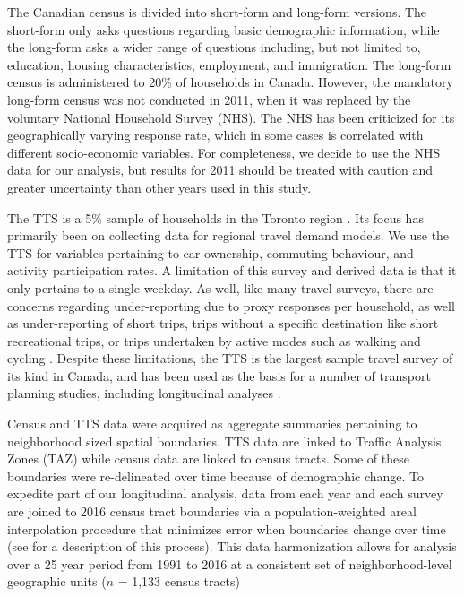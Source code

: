 The Canadian census is divided into short-form and long-form versions. The short-form only asks questions regarding basic demographic information, while the long-form asks a wider range of questions including, but not limited to, education, housing characteristics, employment, and immigration. The long-form census is administered to 20\% of households in Canada. However, the mandatory long-form census was not conducted in 2011, when it was replaced by the voluntary National Household Survey (NHS). The NHS has been criticized for its geographically varying response rate, which in some cases is correlated with different socio-economic variables. For completeness, we decide to use the NHS data for our analysis, but results for 2011 should be treated with caution and greater uncertainty than other years used in this study.

The TTS is a 5\% sample of households in the Toronto region \cite{ashby_transportation_2016}. Its focus has primarily been on collecting data for regional travel demand models. We use the TTS for variables pertaining to car ownership, commuting behaviour, and activity participation rates. A limitation of this survey and derived data is that it only pertains to a single weekday. As well, like many travel surveys, there are concerns regarding under-reporting due to proxy responses per household, as well as under-reporting of short trips, trips without a specific destination like short recreational trips, or trips undertaken by active modes such as walking and cycling . Despite these limitations, the TTS is the largest sample travel survey of its kind in Canada, and has been used as the basis for a number of transport planning studies, including longitudinal analyses .

Census and TTS data were acquired as aggregate summaries pertaining to neighborhood sized spatial boundaries. TTS data are linked to Traffic Analysis Zones (TAZ) while census data are linked to census tracts. Some of these boundaries were re-delineated over time because of demographic change. To expedite part of our longitudinal analysis, data from each year and each survey are joined to 2016 census tract boundaries via a population-weighted areal interpolation procedure that minimizes error when boundaries change over time (see  for a description of this process). This data harmonization allows for analysis over a 25 year period from 1991 to 2016 at a consistent set of neighborhood-level geographic units ($n$ = 1,133 census tracts)




